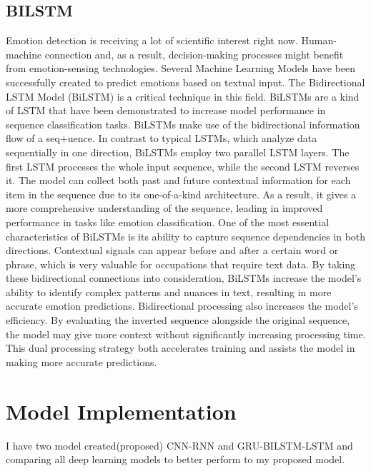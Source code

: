 \documentclass[a4paper,fleqn]{cas-sc}
\begin{document}
\subsection{BILSTM}
Emotion detection is receiving a lot of scientific interest right now. Human-machine connection and, as a result,
decision-making processes might benefit from emotion-sensing technologies. Several Machine Learning Models have been successfully created to predict emotions based on textual input. The Bidirectional LSTM Model (BiLSTM) is a critical technique in this field. BiLSTMs are a kind of LSTM that have been demonstrated to increase model performance in sequence classification tasks. BiLSTMs make use of the bidirectional information flow of a seq+uence. In contrast to typical LSTMs, which analyze data sequentially in one direction, BiLSTMs employ two parallel LSTM layers. The first LSTM processes the whole input sequence, while the second LSTM reverses it. The model can collect both past and future contextual information for each item in the sequence due to its one-of-a-kind architecture. As a result, it gives a more comprehensive understanding of the sequence, leading in improved performance in tasks like emotion classification.\cite{heidari2020short} One of the most essential characteristics of BiLSTMs is its ability to capture sequence dependencies in both directions. Contextual signals can appear before and after a certain word or phrase, which is very valuable for occupations that require text data. By taking these bidirectional connections into consideration, BiLSTMs increase the model’s ability to identify complex patterns and nuances in text, resulting in more accurate emotion predictions. Bidirectional processing also increases the model’s efficiency. By evaluating the inverted sequence alongside the original sequence, the model may give more context without significantly increasing processing time. This dual processing strategy both accelerates training and assists the model in making more accurate predictions.\cite{wang2011solar}



\section{Model Implementation}
I have two model created(proposed) CNN-RNN and GRU-BILSTM-LSTM and comparing all deep learning models to better perform to my proposed model.  
\end{document}
